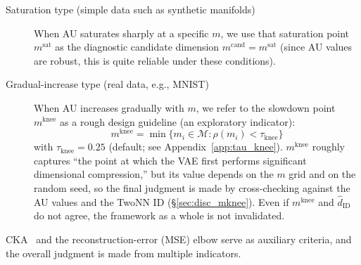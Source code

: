 \documentclass[make,article,submit,pdftex,moreauthors]{Definitions/mdpi}
\newcommand{\dzopt}{m^{\mathrm{cand}}}
\newcommand{\dzsat}{m^{\mathrm{sat}}}
\newcommand{\mknee}{m^{\mathrm{knee}}}
\begin{document}
\begin{description}
  \item[Saturation type (simple data such as synthetic manifolds)]
        When AU saturates sharply at a specific $m$, we use that saturation point
        $\dzsat$ as the diagnostic candidate dimension $\dzopt = \dzsat$
        (since AU values are robust, this is quite reliable under these
        conditions).
  \item[Gradual-increase type (real data, e.g., MNIST)]
        When AU increases gradually with $m$, we refer to the slowdown point
        $\mknee$ as a rough design guideline (an exploratory indicator):
        \begin{equation}
          \mknee = \min\{m_i \in \mathcal{M} : \rho(m_i) < \tau_{\mathrm{knee}}\}
          \label{eq:mknee}
        \end{equation}
        with $\tau_{\mathrm{knee}} = 0.25$ (default; see Appendix~\ref{app:tau_knee}).
        $\mknee$ roughly captures ``the point at which the VAE first performs
        significant dimensional compression,'' but its value depends on the $m$
        grid and on the random seed, so the final judgment is made by
        cross-checking against the AU values and the TwoNN ID
        (§\ref{sec:disc_mknee}).
        Even if $\mknee$ and $\hat{d}_\mathrm{ID}$ do not agree, the framework as a
        whole is not invalidated.
\end{description}

CKA~\cite{kornblith2019cka} and the reconstruction-error (MSE) elbow serve as
auxiliary criteria, and the overall judgment is made from multiple indicators.
\end{document}
